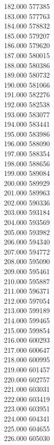 { 182.000	577385 \\
 183.000	577763 \\
 184.000	578832 \\
 185.000	579207 \\
 186.000	579620 \\
 187.000	580015 \\
 188.000	580386 \\
 189.000	580732 \\
 190.000	581066 \\
 191.000	582276 \\
 192.000	582538 \\
 193.000	583077 \\
 194.000	583441 \\
 195.000	583986 \\
 196.000	588090 \\
 197.000	588354 \\
 198.000	588656 \\
 199.000	589084 \\
 200.000	589929 \\
 201.000	589963 \\
 202.000	590336 \\
 203.000	593184 \\
 204.000	593569 \\
 205.000	593982 \\
 206.000	594340 \\
 207.000	594772 \\
 208.000	595090 \\
 209.000	595461 \\
 210.000	595887 \\
 211.000	596371 \\
 212.000	597054 \\
 213.000	599189 \\
 214.000	599465 \\
 215.000	599854 \\
 216.000	600293 \\
 217.000	600647 \\
 218.000	600995 \\
 219.000	601457 \\
 220.000	602757 \\
 221.000	603031 \\
 222.000	603419 \\
 223.000	603951 \\
 224.000	604341 \\
 225.000	604655 \\
 226.000	605030 \\
}
